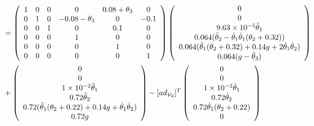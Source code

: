 \documentclass[]{scrreprt}
\newcommand{\myvec}[1]{\left(\begin{array}{c}#1\end{array}\right)}
\begin{document}
\begin{align*}
&=
\left(\begin{array}{cccccc}
1 & 0 & 0 & 0 & 0.08+\theta_3 & 0 \\
0 & 1 & 0 & -0.08-\theta_3 & 0 & -0.1 \\
0 & 0 & 1 & 0 & 0.1 & 0 \\
0 & 0 & 0 & 1 & 0 & 0 \\
0 & 0 & 0 & 0 & 1 & 0 \\
0 & 0 & 0 & 0 & 0 & 1
\end{array}\right)\myvec{0\\0\\\num{+9.63e-5}\tddot{1}\\0.064(\tddot{2}-\tdot{1}\tdot{1}(\theta_2+0.32))\\0.064(\tddot{1}(\theta_2+0.32)+0.14g+2\tdot{1}\tdot{2})\\0.064(g-\tddot{3})}\\
&+\myvec{0\\0\\\num{+1e-2}\tddot{1}\\0.72\tddot{2}\\0.72(\tddot{1}(\theta_2+0.22)+0.14g+\tdot{1}\tdot{2})\\0.72g}-[ad_{\mathcal{V}_2}]^T\myvec{0 \\ 0 \\ \num{+1e-2}\dot{\theta}_1\\ 0.72\dot{\theta}_2\\ 0.72\dot{\theta}_1(\theta_2+0.22)\\ 0}
\end{align*}
\end{document}
